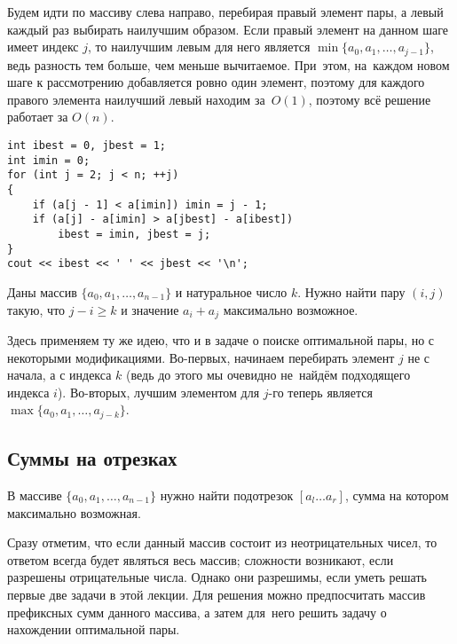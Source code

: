 Будем идти по массиву слева направо, \mbox{перебирая} правый элемент пары, а левый каждый раз выбирать наилучшим образом. Если правый элемент на данном шаге \mbox{имеет} индекс $j$, то наилучшим \mbox{левым} для него является $\min\{a_0, a_1, \ldots, a_{j - 1}\}$, ведь разность тем больше, чем меньше \mbox{вычитаемое}. При~этом, на~каждом новом шаге к рассмотрению добавляется ровно один элемент, поэтому для каждого правого элемента наилучший левый находим за~$O(1)$, поэтому всё решение работает за $O(n)$.

\begin{verbatim}
int ibest = 0, jbest = 1;
int imin = 0;
for (int j = 2; j < n; ++j)
{
    if (a[j - 1] < a[imin]) imin = j - 1;
    if (a[j] - a[imin] > a[jbest] - a[ibest])
        ibest = imin, jbest = j;
}
cout << ibest << ' ' << jbest << '\n';
\end{verbatim}

\begin{problem}
    Даны массив $\{a_0, a_1, \ldots, a_{n - 1}\}$ и натуральное число $k$. Нужно найти пару $(i, j)$ такую, что $j - i \geqslant k$ и значение $a_i + a_j$ максимально возможное.
\end{problem}

Здесь применяем ту же идею, что и в задаче о поиске оптимальной \mbox{пары}, но с некоторыми модификациями. Во-первых, начинаем \mbox{перебирать} элемент $j$ не с начала, а с индекса $k$ (ведь до этого мы очевидно не~\mbox{найдём} подходящего индекса $i$). Во-вторых, лучшим элементом для $j$-го \mbox{теперь} является $\max\{a_0, a_1, \ldots, a_{j - k}\}$.

\subsection{Суммы на отрезках}

\begin{problem}
    В массиве $\{a_0, a_1, \ldots, a_{n - 1}\}$ нужно найти подотрезок $[a_l\ldots a_r]$, сумма на котором максимально возможная.
\end{problem}

Сразу отметим, что если данный массив состоит из неотрицательных чисел, то ответом всегда будет являться весь массив; сложности возникают, если разрешены отрицательные числа. Однако они разрешимы, \mbox{если} уметь решать первые две задачи в этой лекции. Для решения можно \mbox{предпосчитать} массив префиксных сумм данного массива, а затем для~него решить задачу о нахождении оптимальной пары.

